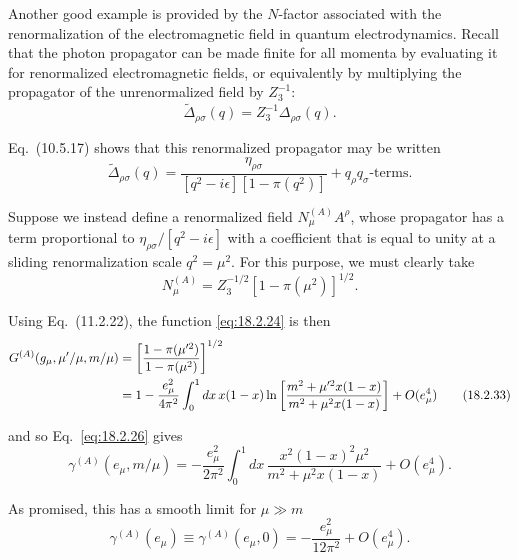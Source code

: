 Another good example is provided by the $N$-factor associated with the
renormalization of the electromagnetic field in quantum electrodynamics.
Recall that the photon propagator can be made finite for all momenta by
evaluating it for renormalized electromagnetic fields, or equivalently by
multiplying the propagator of the unrenormalized field by $Z_3^{-1}$:
\begin{equation}
\widetilde\Delta_{\rho\sigma}(q)=Z_3^{-1}\Delta_{\rho\sigma}(q).
\tag{18.2.30}\label{eq:18.2.30}
\end{equation}
\par\noindent
Eq.~(10.5.17) shows that this renormalized propagator may be written
\begin{equation}
\widetilde\Delta_{\rho\sigma}(q)
=\frac{\eta_{\rho\sigma}}{[q^2-i\epsilon][1-\pi(q^2)]}
+q_\rho q_\sigma\text{-terms}.
\tag{18.2.31}\label{eq:18.2.31}
\end{equation}
\par\noindent
Suppose we instead define a renormalized field $N_\mu^{(A)}A^\rho$, whose
propagator has a term proportional to $\eta_{\rho\sigma}/[q^2-i\epsilon]$
with a coefficient that is equal to unity at a sliding renormalization scale
$q^2=\mu^2$. For this purpose, we must clearly take
\begin{equation}
N_\mu^{(A)}=Z_3^{-1/2}[1-\pi(\mu^2)]^{1/2}.
\tag{18.2.32}\label{eq:18.2.32}
\end{equation}
\par\noindent
Using Eq.~(11.2.22), the function \eqref{eq:18.2.24} is then
\begin{align}
G^{(A)}(g_\mu,\mu'/\mu,m/\mu)
&=\left[\frac{1-\pi(\mu'^2)}{1-\pi(\mu^2)}\right]^{1/2}\notag\\
&=1-\frac{e_\mu^2}{4\pi^2}\int_0^1dx\,x(1-x)
\ln\left[\frac{m^2+\mu'^2x(1-x)}{m^2+\mu^2x(1-x)}\right]
+O(e_\mu^4)
\tag{18.2.33}\label{eq:18.2.33}
\end{align}
\par\noindent
and so Eq.~\eqref{eq:18.2.26} gives
\begin{equation}
\gamma^{(A)}(e_\mu,m/\mu)
=-\frac{e_\mu^2}{2\pi^2}\int_0^1dx\,
\frac{x^2(1-x)^2\mu^2}{m^2+\mu^2x(1-x)}+O(e_\mu^4).
\tag{18.2.34}\label{eq:18.2.34}
\end{equation}
\par\noindent
As promised, this has a smooth limit for $\mu\gg m$
\begin{equation}
\gamma^{(A)}(e_\mu)\equiv\gamma^{(A)}(e_\mu,0)
=-\frac{e_\mu^2}{12\pi^2}+O(e_\mu^4).
\tag{18.2.35}\label{eq:18.2.35}
\end{equation}
\par\noindent

